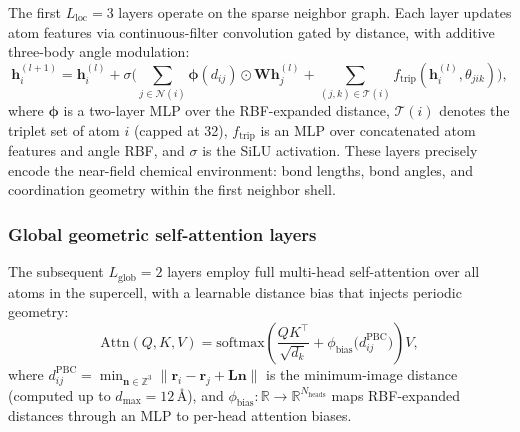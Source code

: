 The first $L_\mathrm{loc} = 3$ layers operate on the sparse neighbor graph.
Each layer updates atom features via continuous-filter convolution gated by
distance, with additive three-body angle modulation:
\begin{equation}\label{eq:local}
  \mathbf{h}_i^{(l+1)} = \mathbf{h}_i^{(l)}
    + \sigma\!\Biggl(
      \sum_{j \in \mathcal{N}(i)} \boldsymbol{\phi}(d_{ij})
        \odot \mathbf{W}\mathbf{h}_j^{(l)}
      + \!\!\sum_{(j,k) \in \mathcal{T}(i)}\!\!
        f_\mathrm{trip}(\mathbf{h}_i^{(l)}, \theta_{jik})
    \Biggr),
\end{equation}
where $\boldsymbol{\phi}$ is a two-layer MLP over the RBF-expanded distance,
$\mathcal{T}(i)$ denotes the triplet set of atom $i$ (capped at 32),
$f_\mathrm{trip}$ is an MLP over concatenated atom features and
angle RBF, and $\sigma$ is the SiLU activation.
These layers precisely encode the near-field chemical environment:
bond lengths, bond angles, and coordination geometry within the first
neighbor shell.

\subsubsection{Global geometric self-attention layers}

The subsequent $L_\mathrm{glob} = 2$ layers employ full multi-head
self-attention over all atoms in the supercell, with a learnable distance
bias that injects periodic geometry:
\begin{equation}\label{eq:global_attn}
  \mathrm{Attn}(Q, K, V)
    = \mathrm{softmax}\!\left(
        \frac{QK^\top}{\sqrt{d_k}}
        + \phi_\mathrm{bias}\!\bigl(d_{ij}^{\mathrm{PBC}}\bigr)
      \right) V,
\end{equation}
where $d_{ij}^{\mathrm{PBC}} = \min_{\mathbf{n} \in \mathbb{Z}^3}
\|\mathbf{r}_i - \mathbf{r}_j + \mathbf{L}\mathbf{n}\|$ is the
minimum-image distance (computed up to $d_\mathrm{max} = 12$\,\AA{}),
and $\phi_\mathrm{bias}: \mathbb{R} \to \mathbb{R}^{N_\mathrm{heads}}$ maps
RBF-expanded distances through an MLP to per-head attention biases.

